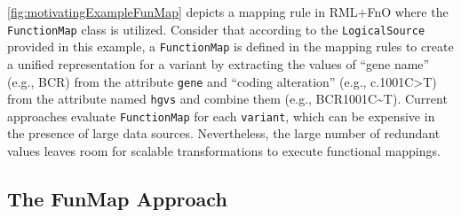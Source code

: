 \autoref{fig:motivatingExampleFunMap} depicts a mapping rule in  RML+FnO where the \verb|FunctionMap| class is utilized. Consider that according to the \verb|LogicalSource| provided in this example, a \verb|FunctionMap| is defined in the mapping rules to create a unified representation for a variant by extracting the values of ``gene name'' (e.g., BCR) from the attribute \verb|gene| and 
``coding alteration'' (e.g., c.1001C\textgreater T)  from the attribute named \verb|hgvs| and combine them (e.g., BCR\textunderscore1001C\textasciitilde T). Current approaches evaluate \verb|FunctionMap| for each \verb|variant|, which can be expensive in the presence of large data sources. Nevertheless, the large number of redundant values leaves room for scalable transformations to execute functional mappings. 


\subsection{The FunMap Approach}

